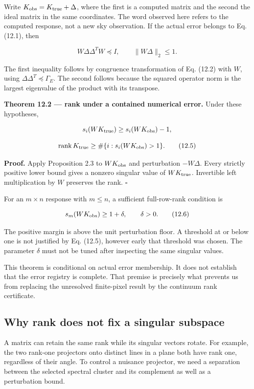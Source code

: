 \documentclass[
  11pt,
  a4paper]{article}
\begin{document}
Write \(K_{\rm obs}=K_{\rm true}+\Delta\), where the first is a computed matrix and the second the ideal matrix in the same coordinates. The word observed here refers to the computed response, not a new sky observation. If the actual error belongs to Eq. (12.1), then

\[
W\Delta\Delta^TW\preceq I,
\qquad\|W\Delta\|_2\le1.
\tag{12.4}
\]

The first inequality follows by congruence transformation of Eq. (12.2) with \(W\), using \(\Delta\Delta^T\preceq\Gamma_E\). The second follows because the squared operator norm is the largest eigenvalue of the product with its transpose.

\textbf{Theorem 12.2 --- rank under a contained numerical error.} Under these hypotheses,

\[
s_i(WK_{\rm true})\ge s_i(WK_{\rm obs})-1,
\]

\[
\operatorname{rank}K_{\rm true}
\ge\#\{i:s_i(WK_{\rm obs})>1\}.
\tag{12.5}
\]

\textbf{Proof.} Apply Proposition 2.3 to \(WK_{\rm obs}\) and perturbation \(-W\Delta\). Every strictly positive lower bound gives a nonzero singular value of \(WK_{\rm true}\). Invertible left multiplication by \(W\) preserves the rank. \(\square\)

For an \(m\times n\) response with \(m\le n\), a sufficient full-row-rank condition is

\[
s_m(WK_{\rm obs})\ge1+\delta,\qquad\delta>0.
\tag{12.6}
\]

The positive margin is above the unit perturbation floor. A threshold at or below one is not justified by Eq. (12.5), however early that threshold was chosen. The parameter \(\delta\) must not be tuned after inspecting the same singular values.

This theorem is conditional on actual error membership. It does not establish that the error registry is complete. That premise is precisely what prevents us from replacing the unresolved finite-pixel result by the continuum rank certificate.

\hypertarget{why-rank-does-not-fix-a-singular-subspace}{%
\subsection{Why rank does not fix a singular subspace}\label{why-rank-does-not-fix-a-singular-subspace}}

A matrix can retain the same rank while its singular vectors rotate. For example, the two rank-one projectors onto distinct lines in a plane both have rank one, regardless of their angle. To control a nuisance projector, we need a separation between the selected spectral cluster and its complement as well as a perturbation bound.
\end{document}
